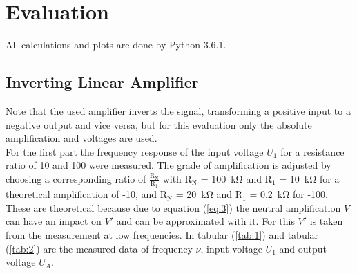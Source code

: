 \section{Evaluation}
All calculations and plots are done by Python 3.6.1.
\subsection{Inverting Linear Amplifier}
Note that the used amplifier inverts the signal, transforming a positive input to a negative output and vice versa, but for this evaluation only the absolute
amplification and voltages are used. \\
\noindent
For the first part the frequency response of the input voltage $U_1$ for a resistance ratio of 10 and 100 were measured.
The grade of amplification is adjusted by choosing a corresponding ratio of $\frac{\text{R}_\text{N}}{\text{R}_\text{1}}$ with
${\text{R}_\text{N}}$ = \SI{100}{\kilo\ohm} and ${\text{R}_\text{1}}$ = \SI{10}{\kilo\ohm} for a theoretical amplification of -10, and
${\text{R}_\text{N}}$ = \SI{20}{\kilo\ohm} and ${\text{R}_\text{1}}$ = \SI{0.2}{\kilo\ohm} for -100. These are theoretical because due
to equation (\ref{eq:3}) the neutral amplification $V$ can have an impact on $V'$ and can be approximated with it. For this $V'$ is taken from the measurement at low frequencies. In tabular (\ref{tab:1}) and tabular (\ref{tab:2})
are the measured data of frequency $\nu$, input voltage $U_1$ and output voltage $U_A$.

